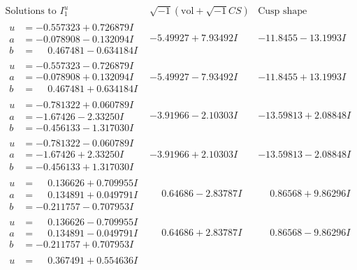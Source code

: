 \documentclass[1p]{elsarticle_modified}
\theoremstyle{definition}
\newcommand{\I}{\sqrt{-1}}
\begin{document}
$$\begin{array}{c|c|c}  
\text{Solutions to }I^u_{1}& \I (\text{vol} + \sqrt{-1}CS) & \text{Cusp shape}\\
 \hline 
\begin{aligned}
u &= -0.557323 + 0.726879 I \\
a &= -0.078908 - 0.132094 I \\
b &= \phantom{-}0.467481 - 0.634184 I\end{aligned}
 & -5.49927 + 7.93492 I & -11.8455 - 13.1993 I \\ \hline\begin{aligned}
u &= -0.557323 - 0.726879 I \\
a &= -0.078908 + 0.132094 I \\
b &= \phantom{-}0.467481 + 0.634184 I\end{aligned}
 & -5.49927 - 7.93492 I & -11.8455 + 13.1993 I \\ \hline\begin{aligned}
u &= -0.781322 + 0.060789 I \\
a &= -1.67426 - 2.33250 I \\
b &= -0.456133 - 1.317030 I\end{aligned}
 & -3.91966 - 2.10303 I & -13.59813 + 2.08848 I \\ \hline\begin{aligned}
u &= -0.781322 - 0.060789 I \\
a &= -1.67426 + 2.33250 I \\
b &= -0.456133 + 1.317030 I\end{aligned}
 & -3.91966 + 2.10303 I & -13.59813 - 2.08848 I \\ \hline\begin{aligned}
u &= \phantom{-}0.136626 + 0.709955 I \\
a &= \phantom{-}0.134891 + 0.049791 I \\
b &= -0.211757 - 0.707953 I\end{aligned}
 & \phantom{-}0.64686 - 2.83787 I & \phantom{-}0.86568 + 9.86296 I \\ \hline\begin{aligned}
u &= \phantom{-}0.136626 - 0.709955 I \\
a &= \phantom{-}0.134891 - 0.049791 I \\
b &= -0.211757 + 0.707953 I\end{aligned}
 & \phantom{-}0.64686 + 2.83787 I & \phantom{-}0.86568 - 9.86296 I \\ \hline\begin{aligned}
u &= \phantom{-}0.367491 + 0.554636 I \\

\end{aligned}
\end{array}$$
\end{document}

